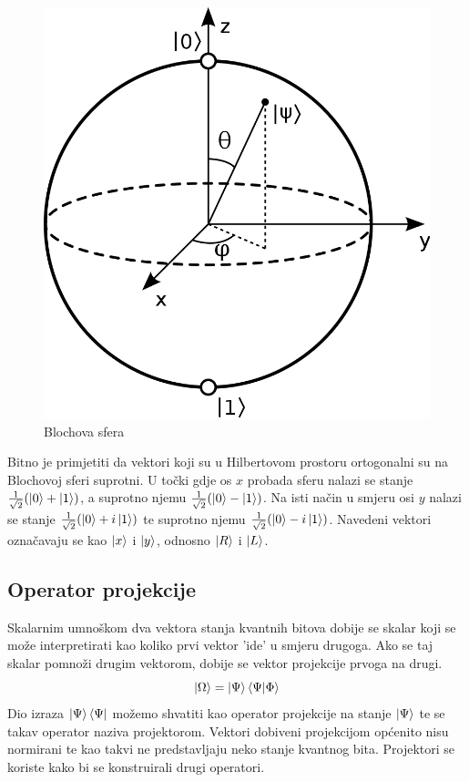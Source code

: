 \begin{figure}[H]
\centering
\includegraphics[scale=0.2]{img/bloch.png}
\caption{Blochova sfera} 
\end{figure}

Bitno je primjetiti da vektori koji su u Hilbertovom prostoru ortogonalni su na Blochovoj sferi suprotni. U točki gdje os $x$ probada sferu nalazi se stanje $\frac{1}{\sqrt{2}}(\ket{0} + \ket{1})$, a suprotno njemu $\frac{1}{\sqrt{2}}(\ket{0} - \ket{1})$. Na isti način u smjeru osi $y$ nalazi se stanje $\frac{1}{\sqrt{2}}(\ket{0} + i\ket{1})$ te suprotno njemu $\frac{1}{\sqrt{2}}(\ket{0} - i\ket{1})$. Navedeni vektori označavaju se kao $\ket{x}$ i $\ket{y}$, odnosno $\ket{R}$ i $\ket{L}$.

\subsection{Operator projekcije}

Skalarnim umnoškom dva vektora stanja kvantnih bitova dobije se skalar koji se može interpretirati kao koliko prvi vektor 'ide' u smjeru drugoga. Ako se taj skalar pomnoži drugim vektorom, dobije se vektor projekcije prvoga na drugi.
\[
\ket{\Omega} = \ket{\Psi}\braket{\Psi|\Phi}
\]
Dio izraza $\ket{\Psi}\bra{\Psi}$ možemo shvatiti kao operator projekcije na stanje $\ket{\Psi}$ te se takav operator naziva projektorom. Vektori dobiveni projekcijom općenito nisu normirani te kao takvi ne predstavljaju neko stanje kvantnog bita. Projektori se koriste kako bi se konstruirali drugi operatori.

